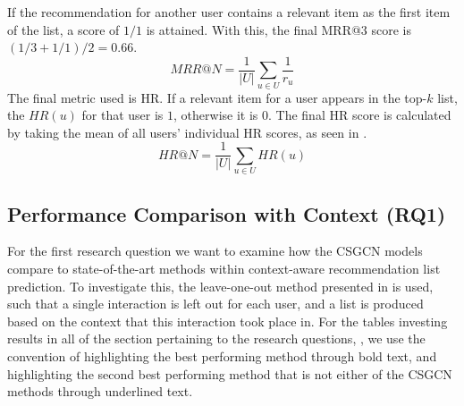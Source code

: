 If the recommendation for another user contains a relevant item as the first item of the list, a score of $1/1$ is attained.
With this, the final MRR@3 score is $(1/3 + 1/1) / 2 = 0.66$.
\begin{equation}
    \label{eqn:mrr}
    MRR@N = \frac{1}{|U|} \sum\limits_{u \in U}\frac{1}{r_u}
\end{equation}
The final metric used is HR.
If a relevant item for a user appears in the top-$k$ list, the $HR(u)$ for that user is $1$, otherwise it is $0$.
The final HR score is calculated by taking the mean of all users' individual HR scores, as seen in .
\begin{equation}
    \label{eqn:hr}
    HR@N = \frac{1}{|U|} \sum\limits_{u \in U}HR(u)
\end{equation}

\subsection{Performance Comparison with Context (RQ1)}\label{subsec:rq1}
For the first research question we want to examine how the CSGCN models compare to state-of-the-art methods within context-aware recommendation list prediction.
To investigate this, the leave-one-out method presented in  is used, such that a single interaction is left out for each user, and a list is produced based on the context that this interaction took place in.
For the tables investing results in all of the section pertaining to the research questions, , we use the convention of highlighting the best performing method through bold text, and highlighting the second best performing method that is not either of the CSGCN methods through underlined text.
